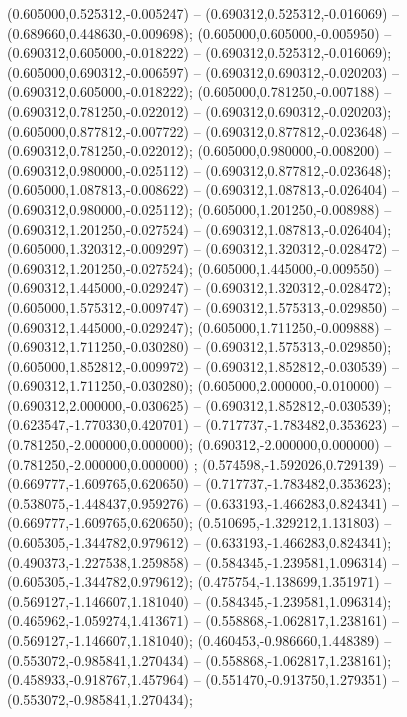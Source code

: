  (0.605000,0.525312,-0.005247) -- (0.690312,0.525312,-0.016069) -- (0.689660,0.448630,-0.009698);
 (0.605000,0.605000,-0.005950) -- (0.690312,0.605000,-0.018222) -- (0.690312,0.525312,-0.016069);
 (0.605000,0.690312,-0.006597) -- (0.690312,0.690312,-0.020203) -- (0.690312,0.605000,-0.018222);
 (0.605000,0.781250,-0.007188) -- (0.690312,0.781250,-0.022012) -- (0.690312,0.690312,-0.020203);
 (0.605000,0.877812,-0.007722) -- (0.690312,0.877812,-0.023648) -- (0.690312,0.781250,-0.022012);
 (0.605000,0.980000,-0.008200) -- (0.690312,0.980000,-0.025112) -- (0.690312,0.877812,-0.023648);
 (0.605000,1.087813,-0.008622) -- (0.690312,1.087813,-0.026404) -- (0.690312,0.980000,-0.025112);
 (0.605000,1.201250,-0.008988) -- (0.690312,1.201250,-0.027524) -- (0.690312,1.087813,-0.026404);
 (0.605000,1.320312,-0.009297) -- (0.690312,1.320312,-0.028472) -- (0.690312,1.201250,-0.027524);
 (0.605000,1.445000,-0.009550) -- (0.690312,1.445000,-0.029247) -- (0.690312,1.320312,-0.028472);
 (0.605000,1.575312,-0.009747) -- (0.690312,1.575313,-0.029850) -- (0.690312,1.445000,-0.029247);
 (0.605000,1.711250,-0.009888) -- (0.690312,1.711250,-0.030280) -- (0.690312,1.575313,-0.029850);
 (0.605000,1.852812,-0.009972) -- (0.690312,1.852812,-0.030539) -- (0.690312,1.711250,-0.030280);
 (0.605000,2.000000,-0.010000) -- (0.690312,2.000000,-0.030625) -- (0.690312,1.852812,-0.030539);
 (0.623547,-1.770330,0.420701) -- (0.717737,-1.783482,0.353623) -- (0.781250,-2.000000,0.000000);
 (0.690312,-2.000000,0.000000) -- (0.781250,-2.000000,0.000000) ;
 (0.574598,-1.592026,0.729139) -- (0.669777,-1.609765,0.620650) -- (0.717737,-1.783482,0.353623);
 (0.538075,-1.448437,0.959276) -- (0.633193,-1.466283,0.824341) -- (0.669777,-1.609765,0.620650);
 (0.510695,-1.329212,1.131803) -- (0.605305,-1.344782,0.979612) -- (0.633193,-1.466283,0.824341);
 (0.490373,-1.227538,1.259858) -- (0.584345,-1.239581,1.096314) -- (0.605305,-1.344782,0.979612);
 (0.475754,-1.138699,1.351971) -- (0.569127,-1.146607,1.181040) -- (0.584345,-1.239581,1.096314);
 (0.465962,-1.059274,1.413671) -- (0.558868,-1.062817,1.238161) -- (0.569127,-1.146607,1.181040);
 (0.460453,-0.986660,1.448389) -- (0.553072,-0.985841,1.270434) -- (0.558868,-1.062817,1.238161);
 (0.458933,-0.918767,1.457964) -- (0.551470,-0.913750,1.279351) -- (0.553072,-0.985841,1.270434);
